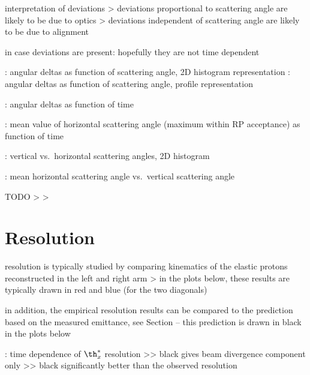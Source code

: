 \> interpretation of deviations
\>> deviations proportional to scattering angle are likely to be due to optics
\>> deviations independent of scattering angle are likely to be due to alignment

\> in case deviations are present: hopefully they are not time dependent

\> : angular deltas as function of scattering angle, 2D histogram representation
\> : angular deltas as function of scattering angle, profile representation

\> : angular deltas as function of time

\> : mean value of horizontal scattering angle (maximum within RP acceptance) as function of time

\> : vertical vs.~horizontal scattering angles, 2D histogram

\> : mean horizontal scattering angle vs.~vertical scattering angle

\> TODO
\>> 
\>> 



\chapter[resolution]{Resolution}

\> resolution is typically studied by comparing kinematics of the elastic protons reconstructed in the left and right arm
\>> in the plots below, these results are typically drawn in red and blue (for the two diagonals)

\> in addition, the empirical resolution results can be compared to the prediction based on the measured emittance, see Section  -- this prediction is drawn in black in the plots below

\> : time dependence of $\th^*_x$ resolution
\>>> black gives beam divergence component only
\>>> black significantly better than the observed resolution


